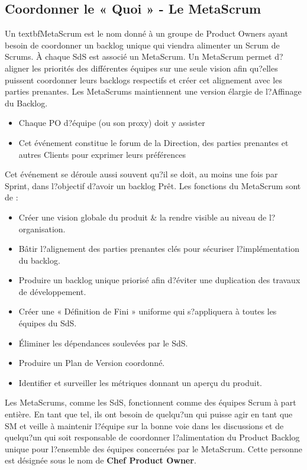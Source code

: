 \documentclass[12pt,a4paper,parskip=full]{scrartcl}
\begin{document}
\subsection{Coordonner le « Quoi » - Le MetaScrum}
Un textbf{MetaScrum} est le nom donné à un groupe de Product Owners ayant besoin de
coordonner un backlog unique qui viendra alimenter un Scrum de Scrums. À chaque SdS
est associé un MetaScrum. Un MetaScrum permet d?aligner les priorités des différentes
équipes sur une seule vision afin qu?elles puissent coordonner leurs backlogs respectifs et
créer cet alignement avec les parties prenantes. Les MetaScrums maintiennent une
version élargie de l?Affinage du Backlog.
\begin{itemize}
\item Chaque PO d?équipe (ou son proxy) doit y assister
\item Cet événement constitue le forum de la Direction, des parties prenantes et
autres Clients pour exprimer leurs préférences
\end{itemize}
Cet événement se déroule aussi souvent qu?il se doit, au moins une fois par Sprint, dans
l?objectif d?avoir un backlog Prêt. Les fonctions du MetaScrum sont de :
\begin{itemize}
\item Créer une vision globale du produit \& la rendre visible au niveau de
l?organisation.
\item Bâtir l?alignement des parties prenantes clés pour sécuriser l?implémentation du
backlog.
\item Produire un backlog unique priorisé afin d?éviter une duplication des travaux de
développement.
\item Créer une « Définition de Fini » uniforme qui s?appliquera à toutes les équipes
du SdS.
\item Éliminer les dépendances soulevées par le SdS.
\item Produire un Plan de Version coordonné.
\item Identifier et surveiller les métriques donnant un aperçu du produit.
\end{itemize}
Les MetaScrums, comme les SdS, fonctionnent comme des équipes Scrum à part entière.
En tant que tel, ils ont besoin de quelqu?un qui puisse agir en tant que SM et veille à
maintenir l?équipe sur la bonne voie dans les discussions et de quelqu?un qui soit
responsable de coordonner l?alimentation du Product Backlog unique pour l?ensemble des
équipes concernées par le MetaScrum. Cette personne est désignée sous le nom de \textbf{Chef
Product Owner}.
\end{document}
